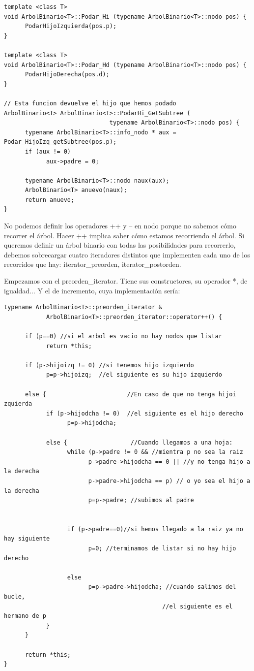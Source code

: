 \documentclass[10pt,a4paper,spanish]{report}
\begin{document}
\begin{verbatim}
template <class T>
void ArbolBinario<T>::Podar_Hi (typename ArbolBinario<T>::nodo pos) {
      PodarHijoIzquierda(pos.p);
}

template <class T>
void ArbolBinario<T>::Podar_Hd (typename ArbolBinario<T>::nodo pos) {
      PodarHijoDerecha(pos.d);
}

// Esta funcion devuelve el hijo que hemos podado
ArbolBinario<T> ArbolBinario<T>::PodarHi_GetSubtree (
                              typename ArbolBinario<T>::nodo pos) {
      typename ArbolBinario<T>::info_nodo * aux = Podar_HijoIzq_getSubtree(pos.p);
      if (aux != 0)
            aux->padre = 0;

      typename ArbolBinario<T>::nodo naux(aux);
      ArbolBinario<T> anuevo(naux);
      return anuevo;
}
\end{verbatim}

\noindent
No podemos definir los operadores ++ y -- en nodo porque no sabemos cómo recorrer el árbol. Hacer ++ implica saber cómo estamos recorriendo el árbol. 
Si queremos definir un árbol binario con todas las posibilidades para recorrerlo, debemos sobrecargar cuatro iteradores distintos que implementen cada uno de los recorridos
que hay: iterator\_preorden, iterator\_postorden.

\noindent
Empezamos con el preorden\_iterator. Tiene sus constructores, su operador *, de igualdad... Y el de incremento, cuya implementación sería:
\begin{verbatim}
typename ArbolBinario<T>::preorden_iterator & 
            ArbolBinario<T>::preorden_iterator::operator++() {

      if (p==0) //si el arbol es vacio no hay nodos que listar
            return *this;

      if (p->hijoizq != 0) //si tenemos hijo izquierdo
            p=p->hijoizq;  //el siguiente es su hijo izquierdo

      else {                       //En caso de que no tenga hijoi zquierda
            if (p->hijodcha != 0)  //el siguiente es el hijo derecho
                  p=p->hijodcha;

            else {                  //Cuando llegamos a una hoja:
                  while (p->padre != 0 && //mientra p no sea la raiz
                        p->padre->hijodcha == 0 || //y no tenga hijo a la derecha
                        p->padre->hijodcha == p) // o yo sea el hijo a la derecha
                        p=p->padre; //subimos al padre
                        

                  if (p->padre==0)//si hemos llegado a la raiz ya no hay siguiente
                        p=0; //terminamos de listar si no hay hijo derecho

                  else 
                        p=p->padre->hijodcha; //cuando salimos del bucle,
                                             //el siguiente es el hermano de p
            }
      }

      return *this;
}
\end{verbatim}
\end{document}
